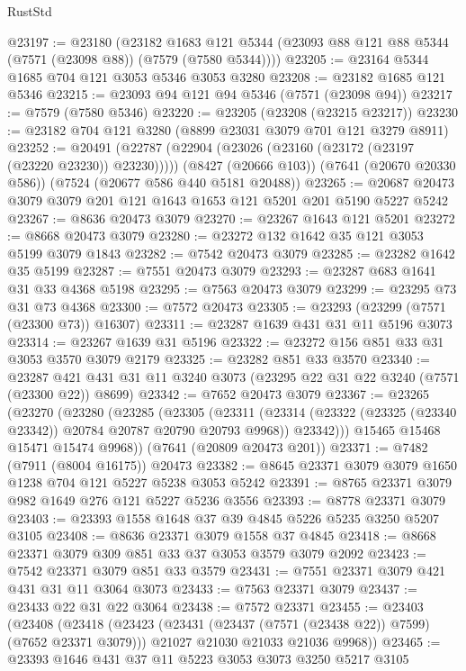 \begin{lexlean}{RustStd}
\begin{coremodule}
{\begin{coremodule}
{{{{{{{{{{{{{{{{{{{{{{{{{{{{{{{{@23197 := @23180
    (@23182 @1683 @121 @5344 (@23093 @88 @121 @88 @5344 (@7571 (@23098 @88)) (@7579 (@7580 @5344))))
@23205 := @23164 @5344 @1685 @704 @121 @3053 @5346 @3053 @3280
@23208 := @23182 @1685 @121 @5346
@23215 := @23093 @94 @121 @94 @5346 (@7571 (@23098 @94))
@23217 := @7579 (@7580 @5346)
@23220 := @23205 (@23208 (@23215 @23217))
@23230 := @23182 @704 @121 @3280 (@8899 @23031 @3079 @701 @121 @3279 @8911)
@23252 := @20491
    (@22787 (@22904 (@23026 (@23160 (@23172 (@23197 (@23220 @23230)) @23230)))))
    (@8427 (@20666 @103))
    (@7641 (@20670 @20330 @586))
    (@7524 (@20677 @586 @440 @5181 @20488))
@23265 := @20687 @20473 @3079 @3079 @201 @121 @1643 @1653 @121 @5201 @201 @5190 @5227 @5242
@23267 := @8636 @20473 @3079
@23270 := @23267 @1643 @121 @5201
@23272 := @8668 @20473 @3079
@23280 := @23272 @132 @1642 @35 @121 @3053 @5199 @3079 @1843
@23282 := @7542 @20473 @3079
@23285 := @23282 @1642 @35 @5199
@23287 := @7551 @20473 @3079
@23293 := @23287 @683 @1641 @31 @33 @4368 @5198
@23295 := @7563 @20473 @3079
@23299 := @23295 @73 @31 @73 @4368
@23300 := @7572 @20473
@23305 := @23293 (@23299 (@7571 (@23300 @73)) @16307)
@23311 := @23287 @1639 @431 @31 @11 @5196 @3073
@23314 := @23267 @1639 @31 @5196
@23322 := @23272 @156 @851 @33 @31 @3053 @3570 @3079 @2179
@23325 := @23282 @851 @33 @3570
@23340 := @23287 @421 @431 @31 @11 @3240 @3073 (@23295 @22 @31 @22 @3240 (@7571 (@23300 @22)) @8699)
@23342 := @7652 @20473 @3079
@23367 := @23265
    (@23270
      (@23280
        (@23285
          (@23305
            (@23311
              (@23314 (@23322 (@23325 (@23340 @23342)) @20784 @20787 @20790 @20793 @9968))
              @23342)))
        @15465
        @15468
        @15471
        @15474
        @9968))
    (@7641 (@20809 @20473 @201))
@23371 := @7482 (@7911 (@8004 @16175)) @20473
@23382 := @8645 @23371 @3079 @3079 @1650 @1238 @704 @121 @5227 @5238 @3053 @5242
@23391 := @8765 @23371 @3079 @982 @1649 @276 @121 @5227 @5236 @3556
@23393 := @8778 @23371 @3079
@23403 := @23393 @1558 @1648 @37 @39 @4845 @5226 @5235 @3250 @5207 @3105
@23408 := @8636 @23371 @3079 @1558 @37 @4845
@23418 := @8668 @23371 @3079 @309 @851 @33 @37 @3053 @3579 @3079 @2092
@23423 := @7542 @23371 @3079 @851 @33 @3579
@23431 := @7551 @23371 @3079 @421 @431 @31 @11 @3064 @3073
@23433 := @7563 @23371 @3079
@23437 := @23433 @22 @31 @22 @3064
@23438 := @7572 @23371
@23455 := @23403
    (@23408
      (@23418
        (@23423 (@23431 (@23437 (@7571 (@23438 @22)) @7599) (@7652 @23371 @3079)))
        @21027
        @21030
        @21033
        @21036
        @9968))
@23465 := @23393 @1646 @431 @37 @11 @5223 @3053 @3073 @3250 @5217 @3105
}}}}}}}}}}}}}}}}}}}}}}}}}}}}}}}}
\end{coremodule}}
\end{coremodule}
\end{lexlean}
